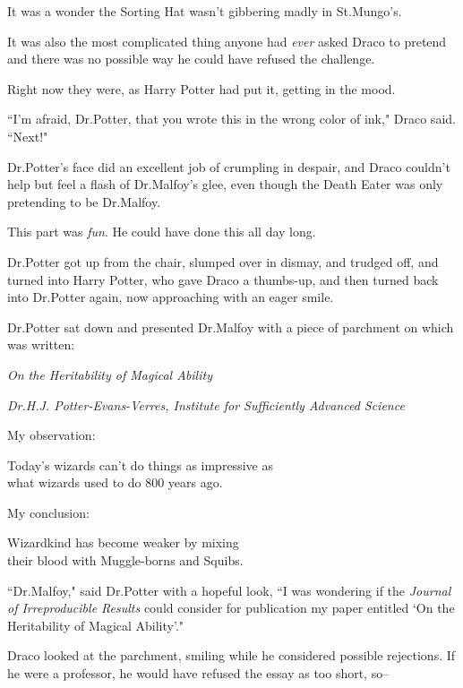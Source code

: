 It was a wonder the Sorting Hat wasn't gibbering madly in St.\?Mungo's.

It was also the most complicated thing anyone had \emph{ever} asked Draco to pretend and there was no possible way he could have refused the challenge.

Right now they were, as Harry Potter had put it, getting in the mood.

``I'm afraid, Dr.\?Potter, that you wrote this in the wrong color of ink," Draco said. ``Next!"

Dr.\?Potter's face did an excellent job of crumpling in despair, and Draco couldn't help but feel a flash of Dr.\?Malfoy's glee, even though the Death Eater was only pretending to be Dr.\?Malfoy.

This part was \emph{fun}. He could have done this all day long.

Dr.\?Potter got up from the chair, slumped over in dismay, and trudged off, and turned into Harry Potter, who gave Draco a thumbs-up, and then turned back into Dr.\?Potter again, now approaching with an eager smile.

Dr.\?Potter sat down and presented Dr.\?Malfoy with a piece of parchment on which was written:

\begin{center}
\emph{On the Heritability of Magical Ability}

\emph{Dr.\?H.\?J. Potter-Evans-Verres, Institute for Sufficiently Advanced Science}
\end{center}

\begin{writtenNote}
My observation:

Today's wizards can't do things as impressive as\\
what wizards used to do 800 years ago.

My conclusion:\nopagebreak

Wizardkind has become weaker by mixing\\
their blood with Muggle-borns and Squibs.
\end{writtenNote}

``Dr.\?Malfoy," said Dr.\?Potter with a hopeful look, ``I was wondering if the \emph{Journal of Irreproducible Results} could consider for publication my paper entitled `On the Heritability of Magical Ability'."

Draco looked at the parchment, smiling while he considered possible rejections. If he were a professor, he would have refused the essay as too short, so\---

